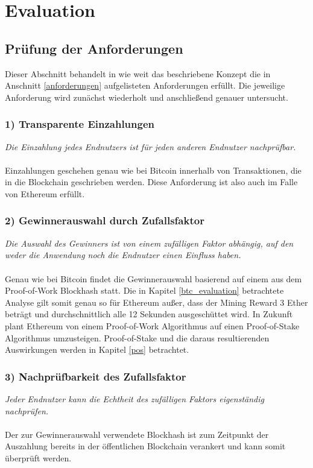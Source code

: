 \section{Evaluation}
\subsection{Prüfung der Anforderungen}

Dieser Abschnitt behandelt in wie weit das beschriebene Konzept die in Anschnitt \ref{anforderungen} aufgelisteten Anforderungen erfüllt. Die jeweilige Anforderung wird zunächst wiederholt und anschließend genauer untersucht.

\subsubsection{1) Transparente Einzahlungen}
\textit{Die Einzahlung jedes Endnutzers ist für jeden anderen Endnutzer nachprüfbar.}\\\\
Einzahlungen geschehen genau wie bei Bitcoin innerhalb von Transaktionen, die in die Blockchain geschrieben werden. Diese Anforderung ist also auch im Falle von Ethereum erfüllt.
\subsubsection{2) Gewinnerauswahl durch Zufallsfaktor}
\textit{Die Auswahl des Gewinners ist von einem zufälligen Faktor abhängig, auf den weder die Anwendung noch die Endnutzer einen Einfluss haben.}\\\\
Genau wie bei Bitcoin findet die Gewinnerauswahl basierend auf einem aus dem Proof-of-Work Blockhash statt. Die in Kapitel \ref{btc_evaluation} betrachtete Analyse gilt somit genau so für Ethereum außer, dass der Mining Reward 3 Ether beträgt und durchschnittlich alle 12 Sekunden ausgeschüttet wird. In Zukunft plant Ethereum von einem Proof-of-Work Algorithmus auf einen Proof-of-Stake Algorithmus umzusteigen. Proof-of-Stake und die daraus resultierenden Auswirkungen werden in Kapitel \ref{pos} betrachtet.
\subsubsection{3) Nachprüfbarkeit des Zufallsfaktor}
\textit{Jeder Endnutzer kann die Echtheit des zufälligen Faktors eigenständig nachprüfen.}\\\\
Der zur Gewinnerauswahl verwendete Blockhash ist zum Zeitpunkt der Auszahlung bereits in der öffentlichen Blockchain verankert und kann somit überprüft werden.
